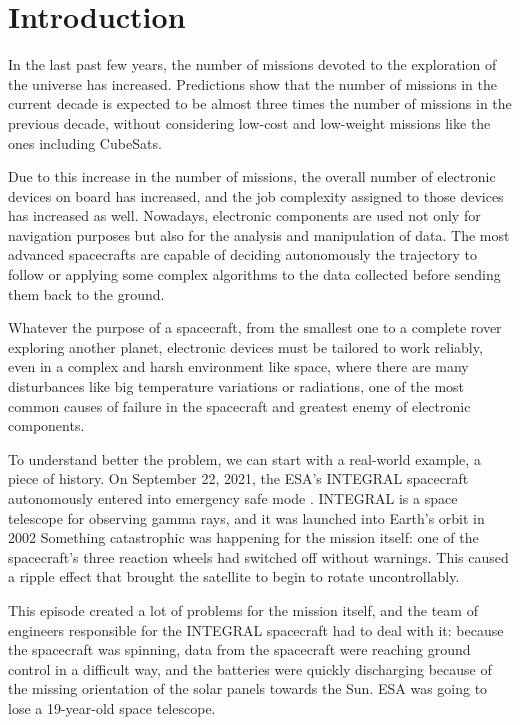 \nocite{xxx}

\chapter{Introduction}
\label{sec:Introduction}

In the last past few years, the number of missions devoted to the exploration of the universe has increased. Predictions show that the number of missions in the current decade is expected to be almost three times the number of missions in the previous decade, without considering low-cost and low-weight missions like the ones including CubeSats. \bigskip

Due to this increase in the number of missions, the overall number of electronic devices on board has increased, and the job complexity assigned to those devices has increased as well. Nowadays, electronic components are used not only for navigation purposes but also for the analysis and manipulation of data. The most advanced spacecrafts are capable of deciding autonomously the trajectory to follow or applying some complex algorithms to the data collected before sending them back to the ground. \bigskip

Whatever the purpose of a spacecraft, from the smallest one to a complete rover exploring another planet, electronic devices must be tailored to work reliably, even in a complex and harsh environment like space, where there are many disturbances like big temperature variations or radiations, one of the most common causes of failure in the spacecraft and greatest enemy of electronic components. \bigskip

To understand better the problem, we can start with a real-world example, a piece of history. On September 22, 2021, the ESA's INTEGRAL spacecraft autonomously entered into emergency safe mode \cite{ESA:INTEGRAL}. INTEGRAL is a space telescope for observing gamma rays, and it was launched into Earth's orbit in 2002 Something catastrophic was happening for the mission itself: one of the spacecraft's three reaction wheels had switched off without warnings. This caused a ripple effect that brought the satellite to begin to rotate uncontrollably. \bigskip

This episode created a lot of problems for the mission itself, and the team of engineers responsible for the INTEGRAL spacecraft had to deal with it: because the spacecraft was spinning, data from the spacecraft were reaching ground control in a difficult way, and the batteries were quickly discharging because of the missing orientation of the solar panels towards the Sun. ESA was going to lose a 19-year-old space telescope. \bigskip


